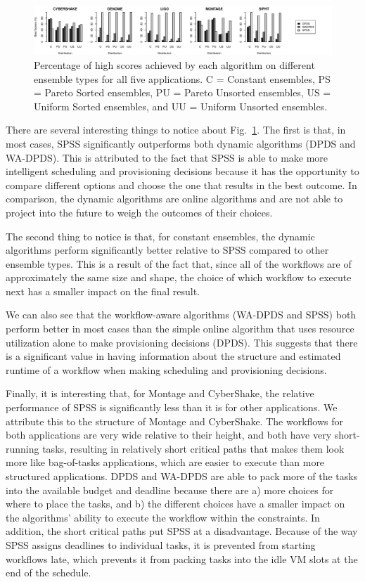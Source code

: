 \documentclass[conference]{IEEEtran}
\begin{document}
\begin{figure}[ht]
    \centering
    \includegraphics[width=\textwidth]{run-finish-variations-test-0-output-distributions}
    \caption{Percentage of high scores achieved by each algorithm on different ensemble types for all five applications. C = Constant ensembles, PS = Pareto Sorted ensembles, PU = Pareto Unsorted ensembles, US = Uniform Sorted ensembles, and UU = Uniform Unsorted ensembles.} 
    \label{fig:distributions}
\end{figure}

There are several interesting things to notice about
Fig.~\ref{fig:distributions}. The first is that, in most cases, SPSS
significantly outperforms both dynamic algorithms (DPDS and WA-DPDS). This is
attributed to the fact that SPSS is able to make more intelligent scheduling
and provisioning decisions because it has the opportunity to compare different
options and choose the one that results in the best outcome. In comparison,
the dynamic algorithms are online algorithms and are not able to project into
the future to weigh the outcomes of their choices.

The second thing to notice is that, for constant ensembles, the dynamic
algorithms perform significantly better relative to SPSS compared to  other
ensemble types. This is a result of the fact that, since all of the workflows
are of approximately the same size and shape, the choice of which workflow to
execute next has a smaller impact on the final result.

We can also see that the workflow-aware
algorithms (WA-DPDS and SPSS) both perform better in most cases than the
simple online algorithm that uses resource utilization alone to make
provisioning decisions (DPDS). This suggests that there is a significant value
in having information about the structure and estimated runtime of a workflow
when making scheduling and provisioning decisions.

Finally, it is interesting that, for Montage and CyberShake, the
relative performance of SPSS is significantly less than it is for other
applications. We attribute this to the structure of Montage and CyberShake.
The workflows for both applications are very wide relative to their height,
and both have very short-running tasks, resulting  in relatively short
critical paths that makes them look more like bag-of-tasks applications, which are easier
to execute than more structured applications. DPDS and WA-DPDS are able to
pack more of the tasks into the available budget and deadline because there
are a) more choices for where to place the tasks, and b) the different choices
have a smaller impact on the algorithms' ability to execute the workflow
within the constraints. In addition, the short critical paths put SPSS at a
disadvantage. Because of the way SPSS assigns deadlines to individual tasks,
it is prevented from starting workflows late, which prevents it from packing
tasks into the idle VM slots at the end of the schedule.
\end{document}
